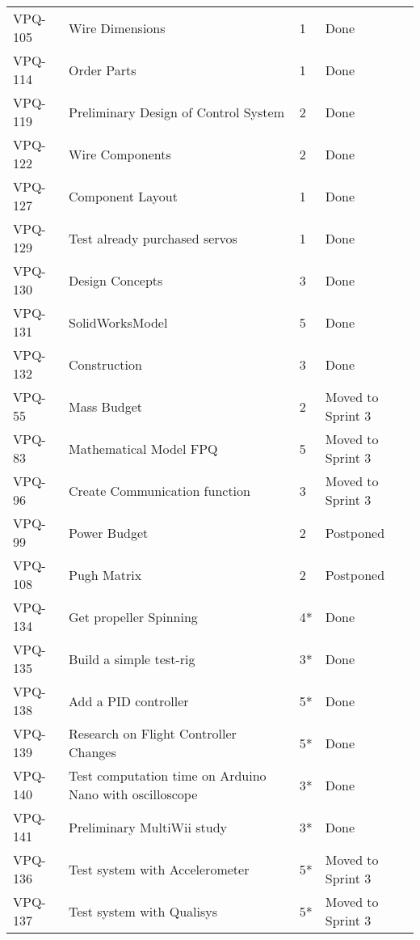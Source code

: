 \begin{table}[ht]
\begin{tabularx}{\linewidth}{|m{1.5cm} m{8.3cm} m{1.5cm} m{3.5cm}|}
\rowcolor{gainsboro} VPQ-105 & Wire Dimensions & 1\centering & Done  \\    
      VPQ-114 & Order Parts & 1\centering & Done  \\
\rowcolor{gainsboro}  VPQ-119 & Preliminary Design of Control System & 2\centering & Done  \\
      VPQ-122 & Wire Components & 2\centering & Done  \\
\rowcolor{gainsboro} VPQ-127 & Component Layout & 1\centering & Done  \\    
      VPQ-129 & Test already purchased servos & 1\centering & Done  \\
\rowcolor{gainsboro}  VPQ-130 & Design Concepts & 3\centering & Done  \\
      VPQ-131 & SolidWorksModel & 5\centering & Done  \\
\rowcolor{gainsboro} VPQ-132 & Construction & 3\centering & Done  \\    
      VPQ-55 & Mass Budget & 2\centering & Moved to Sprint 3  \\
\rowcolor{gainsboro}  VPQ-83 & Mathematical Model FPQ & 5\centering & Moved to Sprint 3  \\
      VPQ-96 & Create Communication function & 3\centering & Moved to Sprint 3  \\
\rowcolor{gainsboro}  VPQ-99 & Power Budget & 2\centering & Postponed  \\
      VPQ-108 & Pugh Matrix & 2\centering & Postponed  \\
\rowcolor{gainsboro}  VPQ-134 & Get propeller Spinning & 4*\centering & Done  \\
      VPQ-135 & Build a simple test-rig & 3*\centering & Done  \\
\rowcolor{gainsboro}  VPQ-138 & Add a PID controller & 5*\centering & Done  \\
      VPQ-139 & Research on Flight Controller Changes & 5*\centering & Done  \\
\rowcolor{gainsboro}  VPQ-140 & Test computation time on Arduino Nano with oscilloscope & 3*\centering & Done  \\
      VPQ-141 & Preliminary MultiWii study & 3*\centering & Done  \\
\rowcolor{gainsboro}  VPQ-136 & Test system with Accelerometer & 5*\centering & Moved to Sprint 3  \\
      VPQ-137 & Test system with Qualisys & 5*\centering & Moved to Sprint 3  \\
\hline    
\end{tabularx}
\end{table}
\clearpage

